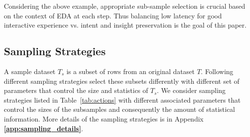 Considering the above example, appropriate sub-sample selection is crucial based on the context of EDA at each step. Thus balancing low latency for good interactive experience vs. intent and insight preservation is the goal of this paper. 


\subsection{Sampling Strategies}

A sample dataset $T_s$ is a subset of rows from an original dataset $T$. Following different sampling strategies select these subsets differently with different set of parameters that control the size and statistics of $T_s$.
We consider sampling strategies listed in Table~\ref{tab:actions} with different associated parameters that control the sizes of the subsamples and consequently the amount of statistical information. More details of the sampling strategies is in Appendix \textbf{\ref{app:sampling_details}}.

\begin{table}
 \label{tab:actions}
\end{table}

